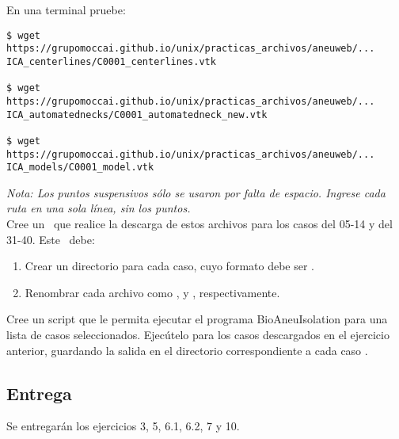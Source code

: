 \begin{ejercicio}
En una terminal pruebe:
\begin{verbatim}
$ wget https://grupomoccai.github.io/unix/practicas_archivos/aneuweb/...
ICA_centerlines/C0001_centerlines.vtk

$ wget https://grupomoccai.github.io/unix/practicas_archivos/aneuweb/...
ICA_automatednecks/C0001_automatedneck_new.vtk

$ wget https://grupomoccai.github.io/unix/practicas_archivos/aneuweb/...
ICA_models/C0001_model.vtk

\end{verbatim}
\textit{Nota: Los puntos suspensivos sólo se usaron por falta de espacio. Ingrese cada ruta en una sola línea, sin los puntos.}\\

Cree un \script~que realice la descarga de estos archivos para los casos del 05-14 y del 31-40. Este \script~debe:

\begin{enumerate}
\item Crear un directorio para cada caso, cuyo formato debe ser .
\item Renombrar cada archivo como ,  y , respectivamente.
\end{enumerate}
\end{ejercicio}

\begin{ejercicio}
Cree un script que le permita ejecutar el programa BioAneuIsolation para una lista de casos seleccionados. Ejecútelo para los casos descargados en el ejercicio anterior, guardando la salida  en el directorio correspondiente a cada caso . 
\end{ejercicio}

\subsection*{Entrega}
Se entregarán los ejercicios 3, 5, 6.1, 6.2, 7 y 10. 

  
